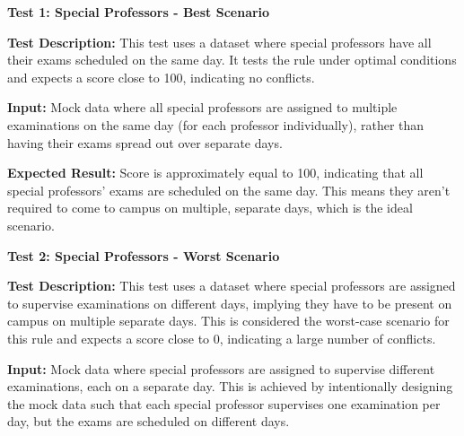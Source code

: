  
\vspace{\baselineskip}


 
 \textbf{Test 1: Special Professors - Best Scenario}


\vspace{\baselineskip}

 
 \textbf{Test Description:}
This test uses a dataset where special professors have all their exams
scheduled on the same day. It tests the rule under optimal conditions and expects a score close
to 100, indicating no conflicts.

\vspace{\baselineskip}


 \textbf{Input:}
Mock data where all special professors are assigned to multiple examinations on the same
day (for each professor individually), rather than having their exams spread out over separate
days.

\vspace{\baselineskip}

 
 \textbf{Expected Result:}
Score is approximately equal to 100, indicating that all special professors'
exams are scheduled on the same day. This means they aren't required to come to campus on
multiple, separate days, which is the ideal scenario.


\vspace{\baselineskip}

 
 \textbf{Test 2: Special Professors - Worst Scenario}


\vspace{\baselineskip}

 
 \textbf{Test Description:}
This test uses a dataset where special professors are assigned to supervise
examinations on different days, implying they have to be present on campus on multiple separate
days. This is considered the worst-case scenario for this rule and expects a score close to 0,
indicating a large number of conflicts.

\vspace{\baselineskip}


 \textbf{Input:}
Mock data where special professors are assigned to supervise different examinations, each
on a separate day. This is achieved by intentionally designing the mock data such that each
special professor supervises one examination per day, but the exams are scheduled on different
days.
 
\vspace{\baselineskip}

